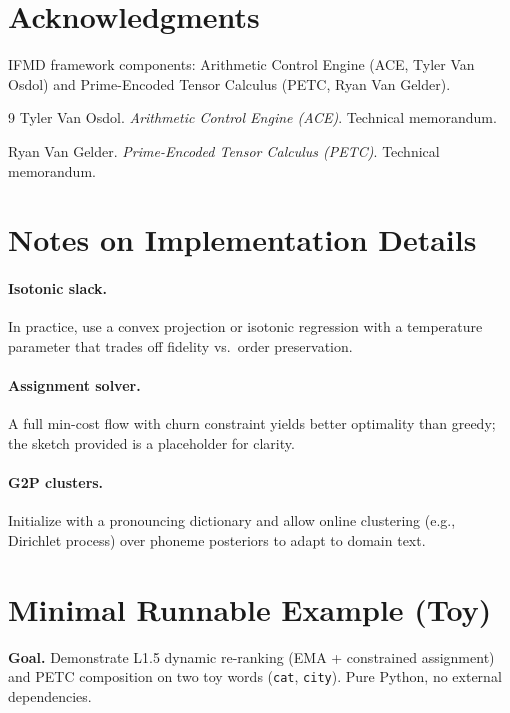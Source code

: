\documentclass[11pt]{article}
\begin{document}
\section*{Acknowledgments}
IFMD framework components: Arithmetic Control Engine (ACE, Tyler Van Osdol) and Prime-Encoded Tensor Calculus (PETC, Ryan Van Gelder).

\begin{thebibliography}{9}
Tyler Van Osdol. \emph{Arithmetic Control Engine (ACE)}. Technical memorandum.

Ryan Van Gelder. \emph{Prime-Encoded Tensor Calculus (PETC)}. Technical memorandum.
\end{thebibliography}

\appendix
\section{Notes on Implementation Details}
\paragraph{Isotonic slack.} In practice, use a convex projection or isotonic regression with a temperature parameter that trades off fidelity vs.~order preservation.


\paragraph{Assignment solver.} A full min-cost flow with churn constraint yields better optimality than greedy; the sketch provided is a placeholder for clarity.


\paragraph{G2P clusters.} Initialize with a pronouncing dictionary and allow online clustering (e.g., Dirichlet process) over phoneme posteriors to adapt to domain text.


\section{Minimal Runnable Example (Toy)}\label{app:toy}
\noindent\textbf{Goal.} Demonstrate L1.5 dynamic re-ranking (EMA + constrained assignment) and PETC composition on two toy words (\texttt{cat}, \texttt{city}). Pure Python, no external dependencies.
\end{document}

